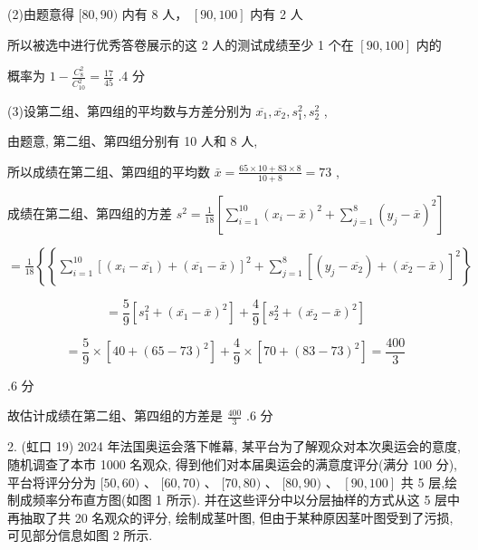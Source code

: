 \documentclass[10pt]{article}
\begin{document}
(2)由题意得 \(\lbrack {80},{90})\) 内有 8 人， \(\left\lbrack  {{90},{100}}\right\rbrack\) 内有 2 人

所以被选中进行优秀答卷展示的这 2 人的测试成绩至少 1 个在 \(\left\lbrack  {{90},{100}}\right\rbrack\) 内的

概率为 \(1 - \frac{{C}_{8}^{2}}{{C}_{10}^{2}} = \frac{17}{45}\) .4 分

(3)设第二组、第四组的平均数与方差分别为 \(\overline{{x}_{1}},\overline{{x}_{2}},{s}_{1}^{2},{s}_{2}^{2}\) ,

由题意, 第二组、第四组分别有 10 人和 8 人,

所以成绩在第二组、第四组的平均数 \(\bar{x} = \frac{{65} \times  {10} + {83} \times  8}{{10} + 8} = {73}\) ,

成绩在第二组、第四组的方差 \({s}^{2} = \frac{1}{18}\left\lbrack  {\mathop{\sum }\limits_{{i = 1}}^{{10}}{\left( {x}_{i} - \bar{x}\right) }^{2} + \mathop{\sum }\limits_{{j = 1}}^{8}{\left( {y}_{j} - \bar{x}\right) }^{2}}\right\rbrack\)

\(= \frac{1}{18}\left\{  \left\{  {\mathop{\sum }\limits_{{i = 1}}^{{10}}{\left\lbrack  \left( {x}_{i} - \overline{{x}_{1}}\right)  + \left( \overline{{x}_{1}} - \bar{x}\right) \right\rbrack  }^{2} + \mathop{\sum }\limits_{{j = 1}}^{8}{\left\lbrack  \left( {y}_{j} - \overline{{x}_{2}}\right)  + \left( \overline{{x}_{2}} - \bar{x}\right) \right\rbrack  }^{2}}\right. \right\}\)

\[
= \frac{5}{9}\left\lbrack  {{s}_{1}^{2} + {\left( \overline{{x}_{1}} - \bar{x}\right) }^{2}}\right\rbrack   + \frac{4}{9}\left\lbrack  {{s}_{2}^{2} + {\left( \overline{{x}_{2}} - \bar{x}\right) }^{2}}\right\rbrack
\]

\[
= \frac{5}{9} \times  \left\lbrack  {{40} + {\left( {65} - {73}\right) }^{2}}\right\rbrack   + \frac{4}{9} \times  \left\lbrack  {{70} + {\left( {83} - {73}\right) }^{2}}\right\rbrack   = \frac{400}{3}
\]

.6 分

故估计成绩在第二组、第四组的方差是 \(\frac{400}{3}\) .6 分

2. (虹口 19) 2024 年法国奥运会落下帷幕, 某平台为了解观众对本次奥运会的意度, 随机调查了本市 1000 名观众, 得到他们对本届奥运会的满意度评分(满分 100 分), 平台将评分分为 \(\lbrack {50},{60})\text{ 、 }\lbrack {60},{70})\text{ 、 }\lbrack {70},{80})\text{ 、 }\lbrack {80},{90})\text{ 、 }\left\lbrack  {{90},{100}}\right\rbrack\) 共 5 层,绘制成频率分布直方图(如图 1 所示). 并在这些评分中以分层抽样的方式从这 5 层中再抽取了共 20 名观众的评分, 绘制成茎叶图, 但由于某种原因茎叶图受到了污损, 可见部分信息如图 2 所示.
\end{document}

